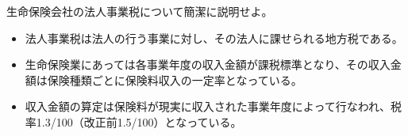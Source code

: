 \documentclass[report,gutter=10mm,fore-edge=10mm,uplatex,dvipdfmx]{jlreq}
\begin{document}

生命保険会社の法人事業税について簡潔に説明せよ。


\begin{itemize}
\tightlist
\item
  法人事業税は法人の行う事業に対し、その法人に課せられる地方税である。
\item
  生命保険業にあっては各事業年度の収入金額が課税標準となり、その収入金額は保険種類ごとに保険料収入の一定率となっている。
\item
  収入金額の算定は保険料が現実に収入された事業年度によって行なわれ、税率1.3/100（改正前1.5/100）となっている。
\end{itemize}
\end{document}
